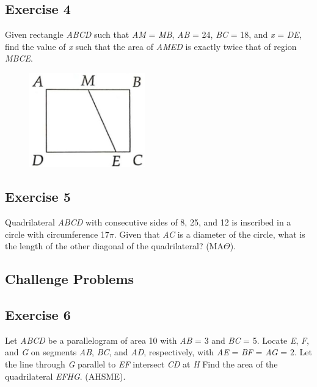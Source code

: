 \documentclass[12pt]{article}
\begin{document}
\subsection*{Exercise 4}
Given rectangle \textit{ABCD} such that \textit{AM} = \textit{MB}, \textit{AB} = 24, \textit{BC} = 18, and \textit{x} = \textit{DE}, find the value of \textit{x} such that the area of \textit{AMED} is exactly twice that of region \textit{MBCE}.

\begin{figure}[htp]
    \includegraphics[width=5cm]{img4.jpg}
\end{figure}
\vspace{1.5in}

\subsection*{Exercise 5}
Quadrilateral \textit{ABCD} with consecutive sides of 8, 25, and 12 is inscribed in a circle with circumference 17$\pi$. Given that \textit{AC} is a diameter of the circle, what is the length of the other diagonal of the quadrilateral? (MA$\Theta$).
\vspace{3in}

\begin{center} 
\subsection*{Challenge Problems}
\end{center} 


\subsection*{Exercise 6}
Let \textit{ABCD} be a parallelogram of area 10 with \textit{AB} = 3 and \textit{BC} = 5. Locate \textit{E}, \textit{F}, and \textit{G} on segments \textit{AB}, \textit{BC}, and \textit{AD}, respectively, with \textit{AE} = \textit{BF} = \textit{AG} = 2. Let the line through \textit{G} parallel to \textit{EF} intersect \textit{CD} at \textit{H} Find the area of the quadrilateral \textit{EFHG}. (AHSME).
\vspace{3in}
\end{document}
